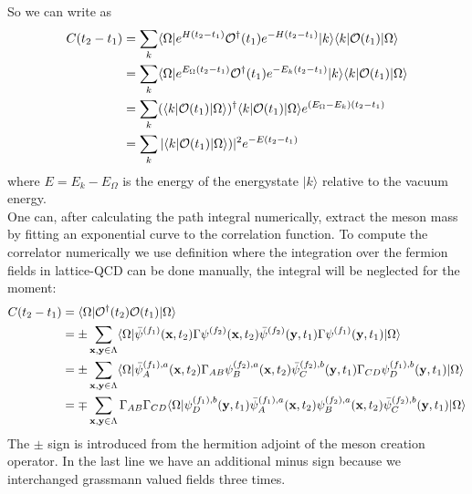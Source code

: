         So we can write  as
        \begin{equation}
            \begin{aligned}
                C(t_2 - t_1) &= \sum_k \langle\Omega|e^{H(t_2 - t_1)}\mathcal{O}^\dagger(t_1)e^{-H(t_2 - t_1)} |k\rangle\langle k| \mathcal{O}(t_1)|\Omega\rangle\\
                &= \sum_k \langle\Omega|e^{E_\Omega(t_2 - t_1)}\mathcal{O}^\dagger(t_1)e^{-E_k(t_2 - t_1)} |k\rangle\langle k| \mathcal{O}(t_1)|\Omega\rangle\\
                &= \sum_k (\langle k|\mathcal{O}(t_1) |\Omega\rangle)^\dagger\langle k| \mathcal{O}(t_1)|\Omega\rangle e^{(E_\Omega - E_k)(t_2 - t_1)}\\
                &= \sum_k |\langle k|\mathcal{O}(t_1) |\Omega\rangle)|^2 e^{-E(t_2 - t_1)}\\
            \end{aligned}
        \end{equation}
        where $E = E_k - E_\Omega$ is the energy of the energystate $|k\rangle$ relative to the vacuum energy.\\
        
        \noindent
        One can, after calculating the path integral numerically, extract the meson mass by fitting an exponential curve to the correlation function.
        To compute the correlator numerically we use definition  where the integration over the fermion fields in lattice-QCD can be done manually, the integral will be neglected for the moment:
        \begin{equation}\label{correlation_in_t}
            \begin{aligned}
                C(t_2 - t_1) &= \langle\Omega|\mathcal{O}^\dagger(t_2)\mathcal{O}(t_1)|\Omega\rangle\\
                &= \pm \sum_{\textbf{x},\textbf{y}\in\Lambda}
                \langle\Omega|\bar{\psi}^{(f_1)}(\textbf{x},t_2)\Gamma\psi^{(f_2)}(\textbf{x},t_2)
                \bar{\psi}^{(f_2)}(\textbf{y},t_1)\Gamma\psi^{(f_1)}(\textbf{y},t_1)|\Omega\rangle\\
                &= \pm \sum_{\textbf{x},\textbf{y}\in\Lambda}
                \langle\Omega|\bar{\psi}_A^{(f_1),a}(\textbf{x},t_2)\Gamma_{AB}\psi_B^{(f_2),a}(\textbf{x},t_2)
                \bar{\psi}^{(f_2),b}_C(\textbf{y},t_1)\Gamma_{CD}\psi_D^{(f_1),b}(\textbf{y},t_1)|\Omega\rangle\\
                &= \mp \sum_{\textbf{x},\textbf{y}\in\Lambda}\Gamma_{AB}\Gamma_{CD}
                \langle\Omega|\psi_D^{(f_1),b}(\textbf{y},t_1)\bar{\psi}_A^{(f_1),a}(\textbf{x},t_2)
                \psi_B^{(f_2),a}(\textbf{x},t_2)\bar{\psi}^{(f_2),b}_C(\textbf{y},t_1)|\Omega\rangle
            \end{aligned}
        \end{equation}
        The $\pm$ sign is introduced from the hermition adjoint  of the meson creation operator. In the last line we have an additional minus sign because we interchanged grassmann valued fields three times.\\
        
